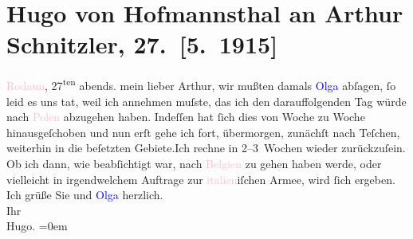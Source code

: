 

               \section[Hugo von Hofmannsthal an Arthur Schnitzler, 27. {[}5. 1915{]}]{ Hugo von Hofmannsthal an Arthur Schnitzler, 27. {[}5. 1915{]}}\nopagebreak{}\rehead{ }\normalsize\beginnumbering{} \toendnotes[C]{\smallbreak\pagebreak[2]} 
\pstart
           \raggedleft{}{\pb}\textcolor{pink}{Rodaun}{}\ledrightnote{\textcolor{pink}{Rodaun}}, 27\textsuperscript{ten}{ }abends.\pend
           \pstart
           mein lieber Arthur, wir mußten damals \textcolor{blue}{Olga}{}\ledrightnote{\textcolor{blue}{Olga Schnitzler}} abſagen, ſo leid es uns tat, weil ich annehmen muſste, das ich den
               darauffolgenden Tag würde nach \textcolor{pink}{Polen}{}\ledrightnote{\textcolor{pink}{Polen}} abzugehen
               haben. Indeſſen hat ſich dies von Woche zu Woche hinausgeſchoben und nun erſt gehe
               ich fort, übermorgen, zunächſt nach Teſchen, weiterhin in die beſetzten
                  Gebiete.\hspace*{1.5em}Ich rechne in 2–3 Wochen {\pb}wieder zurückzuſein. Ob ich dann,
               wie beabſichtigt war, nach \textcolor{pink}{Belgien}{}\ledrightnote{\textcolor{pink}{Belgien}} zu gehen haben
               werde, oder vielleicht in irgendwelchem Auftrage zur \textcolor{pink}{italien}{}\ledrightnote{\textcolor{pink}{Italien}}iſchen Armee, wird ſich ergeben.\pend
           \pstart
           Ich grüße Sie und \textcolor{blue}{Olga}{}\ledrightnote{\textcolor{blue}{Olga Schnitzler}} herzlich.{\\[\baselineskip]}Ihr{\\[\baselineskip]}\spacefill\mbox{Hugo.}\pend
           \leftskip=0em{}\endnumbering{}  
      